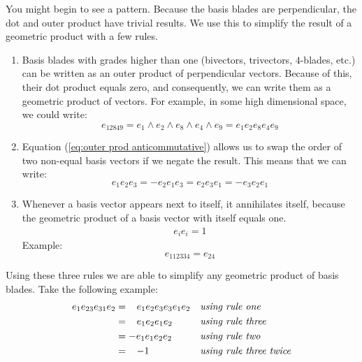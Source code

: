 \documentclass[10pt]{report}
\begin{document}
You might begin to see a pattern. Because the basis blades are
perpendicular, the dot and outer product have trivial results. We
use this to simplify the result of a geometric product with a few
rules.

\begin{enumerate}
    \item
        Basis blades with grades higher than one (bivectors, trivectors,
        $4$-blades, etc.) can be written as an outer product of
        perpendicular vectors. Because of this, their dot product equals
        zero, and consequently, we can write them as a geometric product of
        vectors. For example, in some high dimensional space, we could
        write:
        \begin{displaymath}
            e_{12849} = e_1\wedge e_2\wedge e_8\wedge e_4\wedge e_9 =
            e_1e_2e_8e_4e_9
        \end{displaymath}
    \item
        Equation (\ref{eq:outer prod anticommutative}) allows us to swap
        the order of two non-equal basis vectors if we negate the result.
        This means that we can write:
        \begin{displaymath}
            e_1e_2e_3 = -e_2e_1e_3 = e_2e_3e_1 = -e_3e_2e_1
        \end{displaymath}
    \item
        Whenever a basis vector appears next to itself, it
        annihilates itself, because the geometric product of a basis vector with
        itself equals one.
        \begin{align}
            \label{eq:same basis vectors next to eachother vanishes}
            e_ie_i = 1
        \end{align}
        Example:
        \begin{displaymath}
            e_{112334} = e_{24}
        \end{displaymath}
\end{enumerate}

Using these three rules we are able to simplify any geometric
product of basis blades. Take the following example:
\begin{align}
    e_1e_{23}e_{31}e_2 &=\,\,\;\:e_1e_2e_3e_3e_1e_2  &&\text{\emph{using rule one}}   \nonumber \\
                       &=\,\,\;\:e_1e_2e_1e_2        &&\text{\emph{using rule three}} \nonumber \\
                       &=       -e_1e_1e_2e_2        &&\text{\emph{using rule two}} \nonumber \\
                       &=\,\,\;\:-1                  &&\text{\emph{using rule three twice}} \nonumber \\
\end{align}
\end{document}
